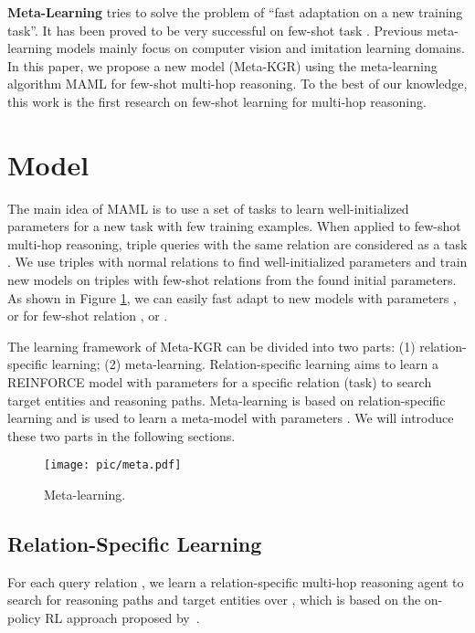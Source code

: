 \documentclass[11pt,a4paper]{article}
\begin{document}
\textbf{Meta-Learning} tries to solve the problem of ``fast adaptation on a new training task''. It has been proved to be very successful on few-shot task \cite{lake2015human, meta-translate}. Previous meta-learning models mainly focus on computer vision and imitation learning domains. In this paper, we propose a new model (Meta-KGR) using the meta-learning algorithm MAML \cite{MAML} for few-shot multi-hop reasoning. To the best of our knowledge, this work is the first research on few-shot learning for multi-hop reasoning.







\section{Model}

The main idea of MAML is to use a set of tasks to learn well-initialized parameters  for a new task with few training examples. When applied to few-shot multi-hop reasoning, triple queries with the same relation  are considered as a task . We use triples with normal relations to find well-initialized parameters  and train new models on triples with few-shot relations from the found initial parameters. As shown in Figure \ref{meta}, we can easily fast adapt to new models with parameters ,  or  for few-shot relation ,  or . 

The learning framework of Meta-KGR can be divided into two parts: (1) relation-specific learning; (2) meta-learning. Relation-specific learning aims to learn a REINFORCE model with parameters  for a specific relation  (task) to search target entities and reasoning paths. Meta-learning is based on relation-specific learning and is used to learn a meta-model with parameters .
We will introduce these two parts in the following sections.

\begin{figure}[t]
\centering
\setlength{\abovecaptionskip}{2pt}
\setlength{\belowcaptionskip}{0pt}
\texttt{[image: pic/meta.pdf]}
\caption{Meta-learning.}
\label{meta}
\end{figure}


\subsection{Relation-Specific Learning}

For each query relation , we learn a relation-specific multi-hop reasoning agent to search for reasoning paths and target entities over , which is based on the on-policy RL approach proposed by~\citet{MultiHop}. 
\end{document}
